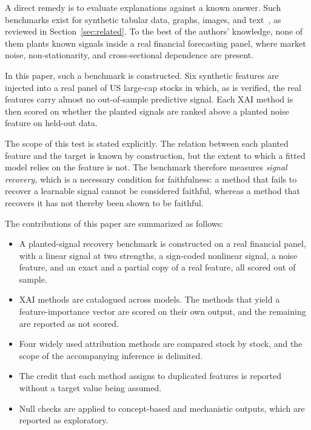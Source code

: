 \documentclass[conference]{IEEEtran}
\begin{document}
A direct remedy is to evaluate explanations against a known answer. Such
benchmarks exist for synthetic tabular data, graphs, images, and
text~\cite{liu2021xaibench,agarwal2022openxai,agarwal2023graphxai,lee2025xaiunits,li2023m4},
as reviewed in Section~\ref{sec:related}. To the best of the authors'
knowledge, none of them plants known signals inside a real financial
forecasting panel, where market noise, non-stationarity, and cross-sectional
dependence are present.

In this paper, such a benchmark is constructed. Six synthetic features are
injected into a real panel of \nTickers{} US large-cap stocks in which, as is
verified, the real features carry almost no out-of-sample predictive signal.
Each XAI method is then scored on whether the planted signals are ranked
above a planted noise feature on held-out data.

The scope of this test is stated explicitly. The relation between each
planted feature and the target is known by construction, but the extent to
which a fitted model relies on the feature is not. The benchmark therefore
measures \emph{signal recovery}, which is a necessary condition for
faithfulness: a method that fails to recover a learnable signal cannot be
considered faithful, whereas a method that recovers it has not thereby been
shown to be faithful.

The contributions of this paper are summarized as follows:
\begin{itemize}
\item A planted-signal recovery benchmark is constructed on a real financial
panel, with a linear signal at two strengths, a sign-coded nonlinear signal,
a noise feature, and an exact and a partial copy of a real feature, all
scored out of sample.
\item \nXaiMethodsCatalogued{} XAI methods are catalogued across
\nModelsZoo{} models. The \nXaiNativeScored{} methods that yield a
feature-importance vector are scored on their own output, and the remaining
\nXaiNotScored{} are reported as not scored.
\item Four widely used attribution methods are compared stock by stock, and
the scope of the accompanying inference is delimited.
\item The credit that each method assigns to duplicated features is
reported without a target value being assumed.
\item Null checks are applied to concept-based and mechanistic outputs,
which are reported as exploratory.
\end{itemize}
\end{document}
